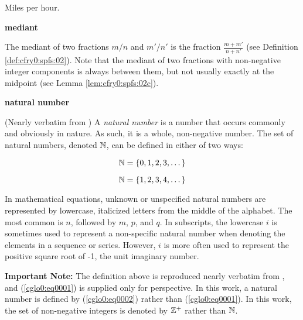 \begin{vworktermglossaryenum}
      Miles per hour.

\item \textbf{mediant}

      The mediant of two fractions $m/n$ and $m'/n'$ is the fraction 
	  $\frac{m+m'}{n+n'}$ (see Definition 
	  \ref{def:cfry0:spfs:02}).  Note that the
	  mediant of two fractions with non-negative integer components
	  is always between them, but not usually exactly at the 
	  midpoint (see Lemma \ref{lem:cfry0:spfs:02c}).

\item \textbf{natural number}%
         
      (Nearly verbatim from \cite{bibref:w:wwwwhatiscom})
      A \emph{natural number}
      is a number that occurs commonly and obviously in nature.  
      As such, it is a whole, non-negative number.  
      The set of natural numbers, denoted ${\mathbb{N}}{}$, 
      can be defined in either of two ways:

      \begin{equation}
      \label{cglo0:eq0001}
      {\mathbb{N}}{} = \{ 0, 1, 2, 3, \ldots{} \}
      \end{equation}

      \begin{equation}
      \label{cglo0:eq0002}
      {\mathbb{N}}{} = \{ 1, 2, 3, 4, \ldots{} \}
      \end{equation}
      
      In mathematical equations, unknown or unspecified natural numbers 
      are represented by lowercase, italicized letters from the 
      middle of the alphabet.  The most common is $n$, followed by 
      $m$, $p$, and $q$.  
      In subscripts, the lowercase $i$ is sometimes used to represent 
      a non-specific natural number when denoting the elements in a 
      sequence or series.  However, $i$ is more often used to represent 
      the positive square root of -1, the unit imaginary number.

      \textbf{Important Note:}  The definition above is reproduced nearly
      verbatim from \cite{bibref:w:wwwwhatiscom}, and (\ref{cglo0:eq0001})
      is supplied only for perspective.  In this work, a natural
      number is defined by (\ref{cglo0:eq0002}) rather than (\ref{cglo0:eq0001}).
      In this work, the set of non-negative integers is denoted by
      ${\mathbb{Z}^+}{}$ rather than ${\mathbb{N}}{}$.%


\end{vworktermglossaryenum}
